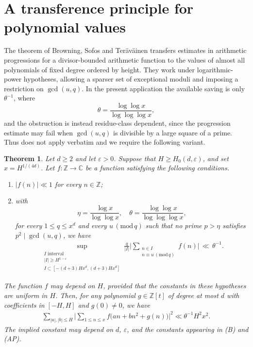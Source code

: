 \documentclass[12pt,reqno]{amsart}
\numberwithin{equation}{section}
\newtheorem{theorem}{Theorem}[section]
\theoremstyle{definition}
\renewcommand{\leq}{\leqslant}
\renewcommand{\le}{\leqslant}
\renewcommand{\ge}{\geqslant}
\newcommand{\ZZ}{\mathbb{Z}}
\newcommand{\CC}{\mathbb{C}}
\renewcommand{\pmod}[1]{\,(\mathrm{mod}\,#1)}
\begin{document}
\section{A transference principle for polynomial values}\label{sec:bst}

The theorem of Browning, Sofos and Ter\"av\"ainen \cite[Theorem~2.2]{BST} transfers estimates in arithmetic progressions for a divisor-bounded arithmetic function to the values of almost all polynomials of fixed degree ordered by height.
They work under logarithmic-power hypotheses, allowing a sparser set of exceptional moduli and imposing a restriction on $\gcd(u,q)$.
In the present application the available saving is only $\theta^{-1}$, where
\[
\theta=\frac{\log\log x}{\log\log\log x},
\]
and the obstruction is instead residue-class dependent, since the progression estimate may fail when $\gcd(u,q)$ is divisible by a large square of a prime.
Thus \cite[Theorem~2.2]{BST} does not apply verbatim and we require the following variant.

\begin{theorem}\label{thm:transference}
Let $d\ge2$ and let $\varepsilon>0$.
Suppose that $H\ge H_0(d,\varepsilon)$, and set $x=H^{1/(4d)}$.
Let $f:\ZZ\to\CC$ be a function satisfying the following conditions.
\begin{enumerate}
\item[\rm (B)] $|f(n)|\ll1$ for every $n\in\ZZ$;
\item[\rm (AP)] with
\[
\eta=\frac{\log x}{\log\log x},
\quad
\theta=\frac{\log\log x}{\log\log\log x},
\]
for every $1\le q\le x^d$ and every $u\pmod q$ such that no prime $p>\eta$ satisfies $p^2\mid\gcd(u,q)$, we have
\begin{align}\label{eq:APeta}
\sup_{\substack{I \text{ interval} \\ |I| \ge H^{1 - \varepsilon} \\
I \subset [-(d+3)Hx^d,(d+3)Hx^d]}}
\frac{q}{|I|}
\Bigg|
\sum_{\substack{n \in I \\ n \equiv u \pmod q}} f(n)
\Bigg| \, \ll \, \theta^{-1}.
\end{align}
\end{enumerate}
The function $f$ may depend on $H$, provided that the constants in these hypotheses are uniform in $H$.
Then, for any polynomial $g\in\ZZ[t]$ of degree at most $d$ with coefficients in $[-H,H]$ and $g(0)\ne0$, we have
\begin{align}\label{eq:transference-second-moment}
\sum_{|a|,|b| \leq H}
\Bigg|
\sum_{1 \leq n \leq x} f\big(a n+b n^2+g(n)\big)
\Bigg|^2 \ll \theta^{-1} H^2 x^2.
\end{align}
The implied constant may depend on $d$, $\varepsilon$, and the constants appearing in \textup{(B)} and \textup{(AP)}.
\end{theorem}
\end{document}
